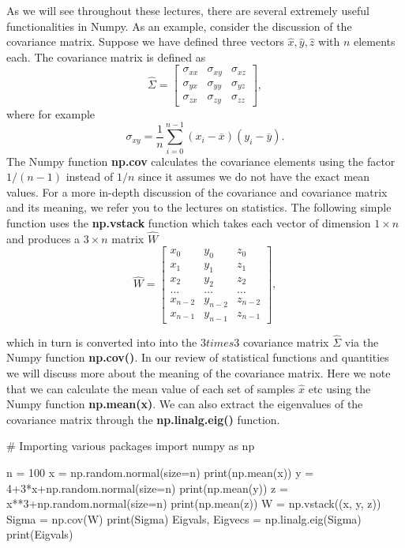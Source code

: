 \documentclass[%
oneside,                 %
final,                   %
10pt]{article}
\begin{document}
As we will see throughout these lectures, there are several extremely useful functionalities in Numpy.
As an example, consider the discussion of the covariance matrix. Suppose we have defined three vectors
$\hat{x}, \hat{y}, \hat{z}$ with $n$ elements each. The covariance matrix is defined as 
\[
\hat{\Sigma} = \begin{bmatrix} \sigma_{xx} & \sigma_{xy} & \sigma_{xz} \\
                              \sigma_{yx} & \sigma_{yy} & \sigma_{yz} \\
                              \sigma_{zx} & \sigma_{zy} & \sigma_{zz} 
             \end{bmatrix},
\]
where for example
\[
\sigma_{xy} =\frac{1}{n} \sum_{i=0}^{n-1}(x_i- \overline{x})(y_i- \overline{y}).
\]
The Numpy function \textbf{np.cov} calculates the covariance elements using the factor $1/(n-1)$ instead of $1/n$ since it assumes we do not have the exact mean values. For a more in-depth discussion of the covariance and covariance matrix and its meaning, we refer you to the lectures on statistics. 
The following simple function uses the \textbf{np.vstack} function which takes each vector of dimension $1\times n$ and produces a $ 3\times n$ matrix $\hat{W}$
\[
\hat{W} = \begin{bmatrix} x_0 & y_0 & z_0 \\
                          x_1 & y_1 & z_1 \\
                          x_2 & y_2 & z_2 \\
                          \dots & \dots & \dots \\
                          x_{n-2} & y_{n-2} & z_{n-2} \\
                          x_{n-1} & y_{n-1} & z_{n-1}
             \end{bmatrix},
\]

which in turn is converted into into the $3 times 3$ covariance matrix
$\hat{\Sigma}$ via the Numpy function \textbf{np.cov()}. In our review of
statistical functions and quantities we will discuss more about the
meaning of the covariance matrix. Here we note that we can calculate
the mean value of each set of samples $\hat{x}$ etc using the Numpy
function \textbf{np.mean(x)}. We can also extract the eigenvalues of the
covariance matrix through the \textbf{np.linalg.eig()} function.

\bpycod
# Importing various packages
import numpy as np

n = 100
x = np.random.normal(size=n)
print(np.mean(x))
y = 4+3*x+np.random.normal(size=n)
print(np.mean(y))
z = x**3+np.random.normal(size=n)
print(np.mean(z))
W = np.vstack((x, y, z))
Sigma = np.cov(W)
print(Sigma)
Eigvals, Eigvecs = np.linalg.eig(Sigma)
print(Eigvals)
\epycod
\end{document}
